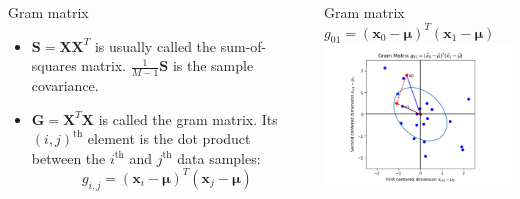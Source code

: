 \documentclass{beamer}
\begin{document}
\begin{frame}
  \begin{columns}
    \column{2.125in}
    \begin{block}{Gram matrix}
      \begin{itemize}
      \item $\mathbf{S}=\mathbf{X}\mathbf{X}^T$ is usually called the
        sum-of-squares matrix.  $\frac{1}{M-1}\mathbf{S}$
        is the sample covariance.
      \item $\mathbf{G}=\mathbf{X}^T\mathbf{X}$ is called the gram matrix.
        Its $(i,j)^{\textrm{th}}$ element is the dot product between
        the $i^{\textrm{th}}$ and $j^{\textrm{th}}$ data samples:
        \[
        g_{i,j}=(\mathbf{x}_i-\bm{\mu})^T(\mathbf{x}_j-\bm{\mu})
        \]
      \end{itemize}
    \end{block}
    \column{2.125in}
    \begin{block}{Gram matrix $g_{01}=(\mathbf{x}_0-\bm{\mu})^T(\mathbf{x}_1-\bm{\mu})$}
      \includegraphics[width=2.1in]{figs/gram_matrix.png}
    \end{block}
  \end{columns}
\end{frame}
\end{document}
